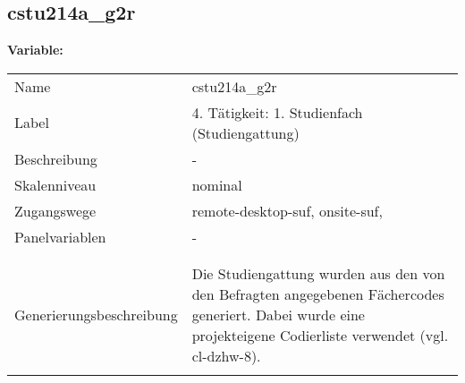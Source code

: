 	
	
	\subsection{cstu214a\_g2r}
	\label{subSection:cstu214a_g2r}

	\noindent\textbf{Variable:}\\
		\begin{tabular}{lL{11.3cm}}
			\label{tableVariable:cstu214a_g2r}
			Name & cstu214a\_g2r \\
			Label & 4. Tätigkeit: 1. Studienfach (Studiengattung) \\
			Beschreibung & - \\
			Skalenniveau & nominal \\
			Zugangswege &
				remote-desktop-suf,
				onsite-suf,
 \\
			Panelvariablen & -
			 \\
			 \\
 \\
					Generierungsbeschreibung & Die Studiengattung wurden aus den von den Befragten angegebenen Fächercodes generiert.  Dabei wurde eine projekteigene Codierliste verwendet (vgl. cl-dzhw-8).
				 \\	
			 \\
		\end{tabular}






